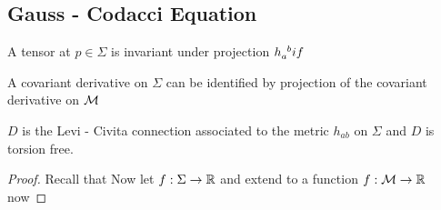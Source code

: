 \documentclass{article}
\begin{document}
\subsection{Gauss - Codacci Equation}
A tensor at $p\in\Sigma$ is invariant under projection $h\indices{_a^b} if $
\begin{prop}
A covariant derivative on $\Sigma$ can be identified by projection of the covariant derivative on $\mathcal{M}$ 
\end{prop}

\begin{lemma}
$D$ is the Levi - Civita connection associated to the metric $h_{ab}$ on $\Sigma$ 
and $D$ is torsion free. 
\end{lemma}
\begin{proof}
Recall that 
Now let $f:\Sigma \to \mathbb{R}$ and extend to a function $f:\mathcal{M} \to \mathbb{R}$ 
now 
\end{proof}
\end{document}
